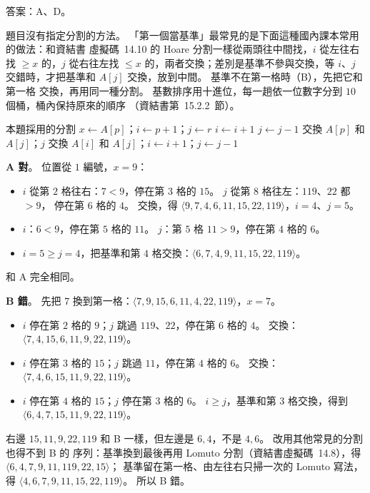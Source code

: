 \begin{pastsoln}
答案：A、D。

題目沒有指定分割的方法。 「第一個當基準」最常見的是下面這種國內課本常用的做法：和資結書
虛擬碼~14.10 的 Hoare 分割一樣從兩頭往中間找，$i$ 從左往右找 $\ge x$ 的，$j$ 從右往左找 $\le x$
的，兩者交換；差別是基準不參與交換，等 $i$、$j$ 交錯時，才把基準和 $A[j]$ 交換，放到中間。 基準不在第一格時（B），先把它和第一格
交換，再用同一種分割。 基數排序用十進位，每一趟依一位數字分到 $10$ 個桶，桶內保持原來的順序
（資結書第~15.2.2~節）。

\begin{pseudo}{本題採用的分割}
    \State $x \gets A[p]$；$i \gets p + 1$；$j \gets r$ 
    \While{\TRUE}
            \State $i \gets i + 1$
        \EndWhile
            \State $j \gets j - 1$
        \EndWhile
            \State 交換 $A[p]$ 和 $A[j]$；\Return $j$
        \EndIf
        \State 交換 $A[i]$ 和 $A[j]$；$i \gets i + 1$；$j \gets j - 1$
    \EndWhile
\EndFunction
\end{pseudo}

\textbf{A 對}。 位置從 $1$ 編號，$x = 9$：
\begin{itemize}
\item $i$ 從第 $2$ 格往右：$7 < 9$，停在第 $3$ 格的 $15$。 $j$ 從第 $8$ 格往左：$119$、$22$ 都 $> 9$，
停在第 $6$ 格的 $4$。 交換，得 $\langle 9, 7, 4, 6, 11, 15, 22, 119\rangle$，$i = 4$、$j = 5$。
\item $i$：$6 < 9$，停在第 $5$ 格的 $11$。 $j$：第 $5$ 格 $11 > 9$，停在第 $4$ 格的 $6$。
\item $i = 5 \ge j = 4$，把基準和第 $4$ 格交換：$\langle 6, 7, 4, 9, 11, 15, 22, 119\rangle$。
\end{itemize}
和 A 完全相同。

\textbf{B 錯}。 先把 $7$ 換到第一格：$\langle 7, 9, 15, 6, 11, 4, 22, 119\rangle$，$x = 7$。
\begin{itemize}
\item $i$ 停在第 $2$ 格的 $9$；$j$ 跳過 $119$、$22$，停在第 $6$ 格的 $4$。 交換：
$\langle 7, 4, 15, 6, 11, 9, 22, 119\rangle$。
\item $i$ 停在第 $3$ 格的 $15$；$j$ 跳過 $11$，停在第 $4$ 格的 $6$。 交換：
$\langle 7, 4, 6, 15, 11, 9, 22, 119\rangle$。
\item $i$ 停在第 $4$ 格的 $15$；$j$ 停在第 $3$ 格的 $6$。 $i \ge j$，基準和第 $3$ 格交換，得到
$\langle 6, 4, 7, 15, 11, 9, 22, 119\rangle$。
\end{itemize}
右邊 $15, 11, 9, 22, 119$ 和 B 一樣，但左邊是 $6, 4$，不是 $4, 6$。 改用其他常見的分割也得不到 B 的
序列：基準換到最後再用 Lomuto 分割（資結書虛擬碼~14.8），得 $\langle 6, 4, 7, 9, 11, 119, 22, 15\rangle$；
基準留在第一格、由左往右只掃一次的 Lomuto 寫法，得 $\langle 4, 6, 7, 9, 11, 15, 22, 119\rangle$。
所以 B 錯。


\end{pastsoln}
